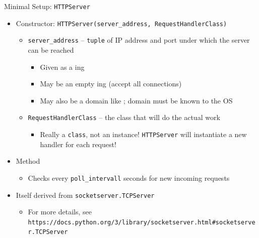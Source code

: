 \begin{frame}{Minimal Setup: \texttt{HTTPServer}}
%
\begin{itemize}
\item Constructor: \texttt{HTTPServer(server\_address, RequestHandlerClass)}
	\begin{itemize}
	\item \texttt{server\_address} -- \texttt{tuple} of IP address and port under which the server can be reached
		\begin{itemize}
		\item Given as a ing
		\item May be an empty ing (accept all connections)
		\item May also be a domain like ; domain must be known to the OS
		\end{itemize}	
	\item \texttt{RequestHandlerClass} -- the class that will do the actual work
		\begin{itemize}
		\item Really a \texttt{class}, not an instance! \texttt{HTTPServer} will instantiate a new handler for each request!
		\end{itemize}
	\end{itemize}
\pause
\item Method 
	\begin{itemize}
	\item Checks every \texttt{poll\_intervall} seconds for new incoming requests
	\end{itemize}
\pause
\item Itself derived from \texttt{socketserver.TCPServer}
	\begin{itemize}
	\item For more details, see \texttt{https://docs.python.org/3/library/socketserver.html\#socketserver.TCPServer}
	\end{itemize}
\end{itemize}
%
\end{frame}


